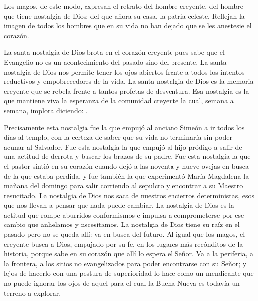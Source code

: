\begin{body}
\begin{body}
{Los magos, de este modo, expresan el retrato del hombre creyente, del hombre que tiene nostalgia de Dios; del que añora su casa, la patria celeste. Reflejan la imagen de todos los hombres que en su vida no han dejado que se les anestesie el corazón.

La santa nostalgia de Dios brota en el corazón creyente pues sabe que el Evangelio no es un acontecimiento del pasado sino del presente. La santa nostalgia de Dios nos permite tener los ojos abiertos frente a todos los intentos reductivos y empobrecedores de la vida. La santa nostalgia de Dios es la memoria creyente que se rebela frente a tantos profetas de desventura. Esa nostalgia es la que mantiene viva la esperanza de la comunidad creyente la cual, semana a semana, implora diciendo: .

Precisamente esta nostalgia fue la que empujó al anciano Simeón a ir todos los días al templo, con la certeza de saber que su vida no terminaría sin poder acunar al Salvador. Fue esta nostalgia la que empujó al hijo pródigo a salir de una actitud de derrota y buscar los brazos de su padre. Fue esta nostalgia la que el pastor sintió en su corazón cuando dejó a las noventa y nueve ovejas en busca de la que estaba perdida, y fue también la que experimentó María Magdalena la mañana del domingo para salir corriendo al sepulcro y encontrar a su Maestro resucitado. La nostalgia de Dios nos saca de nuestros encierros deterministas, esos que nos llevan a pensar que nada puede cambiar. La nostalgia de Dios es la actitud que rompe aburridos conformismos e impulsa a comprometerse por ese cambio que anhelamos y necesitamos. La nostalgia de Dios tiene su raíz en el pasado pero no se queda allí: va en busca del futuro. Al igual que los magos, el creyente  busca a Dios, empujado por su fe, en los lugares más recónditos de la historia, porque sabe en su corazón que allí lo espera el Señor. Va a la periferia, a la frontera, a los sitios no evangelizados para poder encontrarse con su Señor; y lejos de hacerlo con una postura de superioridad lo hace como un mendicante que no puede ignorar los ojos de aquel para el cual la Buena Nueva es todavía un terreno a explorar.

}
\end{body}
\end{body}
